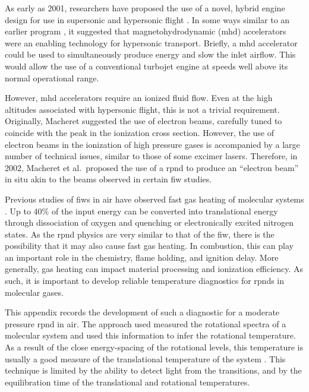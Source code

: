 As early as 2001, researchers have proposed the use of a novel, hybrid engine
design for use in supersonic and hypersonic flight \cite{Macheret2001}. In some
ways similar to an earlier program \cite{Gurijanov1996}, it suggested that
magnetohydrodynamic (\acs{mhd}) accelerators were an enabling technology for
hypersonic transport. Briefly, a \acs{mhd} accelerator could be used to
simultaneously produce energy and slow the inlet airflow. This would allow the
use of a conventional turbojet engine at speeds well above its normal
operational range.

However, \acs{mhd} accelerators require an ionized fluid flow. Even at the high
altitudes associated with hypersonic flight, this is not a trivial requirement.
Originally, Macheret suggested the use of electron beams, carefully tuned to
coincide with the peak in the ionization cross section. However, the use of
electron beams in the ionization of high pressure gases is accompanied by a
large number of technical issues, similar to those of some excimer lasers.
Therefore, in 2002, Macheret et al.\ proposed the use of a \acs{rpnd} to produce
an ``electron beam'' in situ \cite{Macheret2002} akin to the beams observed in
certain \acs{fiw} studies. 

Previous studies of \acs{fiw}s in air have observed fast gas heating of
molecular systems \cite{Popov2011}. Up to 40\% of the input energy can be
converted into translational energy through dissociation of oxygen and quenching
or electronically excited nitrogen states. As the \acs{rpnd} physics are very
similar to that of the \acs{fiw}, there is the possibility that it may also
cause fast gas heating. In combustion, this can play an important role in the
chemistry, flame holding, and ignition delay. More generally, gas heating can
impact material processing and ionization efficiency. As such, it is important
to develop reliable temperature diagnostics for \acs{rpnd}s in molecular gases.

This appendix records the development of such a diagnostic for a moderate
pressure \acs{rpnd} in air. The approach used measured the rotational spectra of
a molecular system and used this information to infer the rotational
temperature. As a result of the close energy-spacing of the rotational levels,
this temperature is usually a good measure of the translational temperature of
the system \cite{Laux1993}. This technique is limited by the ability to detect
light from the transitions, and by the equilibration time of the translational
and rotational temperatures.

